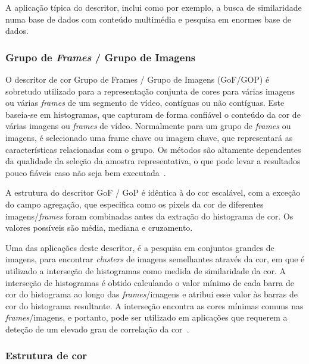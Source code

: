 A aplicação típica do descritor, inclui como por exemplo, a busca de similaridade numa base de dados com conteúdo multimédia e pesquisa em enormes base de dados. 

\subsubsection{Grupo de \textit{Frames} / Grupo de Imagens}

O descritor de cor Grupo de Frames / Grupo de Imagens (GoF/GOP) é sobretudo utilizado para a representação conjunta de cores para várias imagens ou várias \textit{frames} de um segmento de vídeo, contíguas ou não contíguas. Este baseia-se em histogramas, que capturam de forma confiável o conteúdo da cor de várias imagens ou \textit{frames} de vídeo. Normalmente para um grupo de \textit{frames} ou imagens, é selecionado uma frame chave ou imagem chave, que representará as características relacionadas com o grupo. Os métodos são altamente dependentes da qualidade da seleção da amostra representativa, o que pode levar a resultados pouco fiáveis caso não seja bem executada~\cite{Ite-vil}.

A estrutura do descritor GoF / GoP é idêntica à do cor escalável, com a exceção do campo agregação, que especifica como os pixels da cor de diferentes imagens/\textit{frames} foram combinadas antes da extração do histograma de cor. Os valores possíveis são média, mediana e cruzamento. 

Uma das aplicações deste descritor, é a pesquisa em conjuntos grandes de imagens, para encontrar \textit{clusters} de imagens semelhantes através da cor, em que é utilizado a interseção de histogramas como medida de similaridade da cor. A interseção de histogramas é obtido calculando o valor mínimo de cada barra de cor do histograma ao longo das \textit{frames}/imagens e atribui esse valor às barras de cor do histograma resultante. A interseção encontra as cores mínimas comuns nas \textit{frames}/imagens, e portanto, pode ser utilizado em aplicações que requerem a deteção de um elevado grau de correlação da cor~\cite{Christopoulos2000}. 

\subsubsection{Estrutura de cor}

